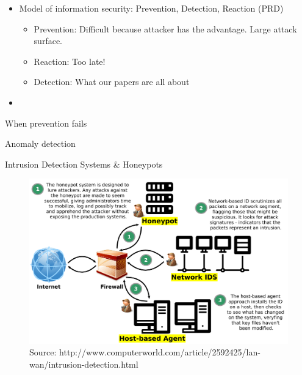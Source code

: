 \documentclass[compress]{beamer}
\begin{document}
\begin{frame}
    \begin{itemize}
        \item Model of information security: Prevention, Detection, Reaction
            (PRD)
            \begin{itemize}
                \item Prevention: Difficult because attacker has the advantage.
                    Large attack surface.


                \item
                    Reaction: Too late!
                \item
                    Detection: What our papers are all about
            \end{itemize}
        \item

    \end{itemize}
\end{frame}
\begin{frame}{When prevention fails}

\end{frame}
\begin{frame}{Anomaly detection}

\end{frame}
\begin{frame}{Intrusion Detection Systems \& Honeypots}
\begin{figure}
 \centering
 \includegraphics[width=1.0\textwidth]{./images/ids-and-honeypot.png}
 \caption{Source: http://www.computerworld.com/article/2592425/lan-wan/intrusion-detection.html}
 \label{fig:ids-and-honeypot}
\end{figure}

\end{frame}
\end{document}
